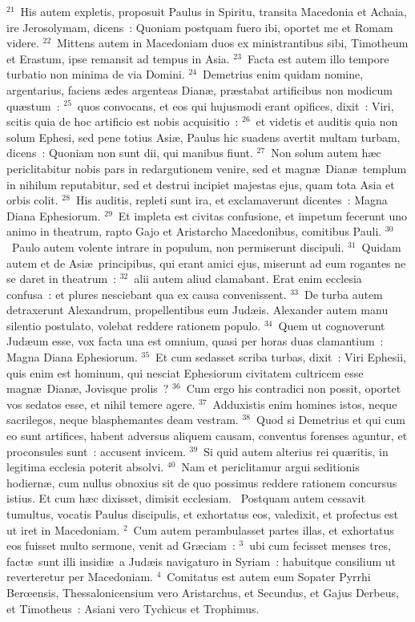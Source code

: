 ${}^{21}$~His autem expletis, proposuit Paulus in Spiritu, transita Macedonia et Achaia, ire Jerosolymam, dicens~: Quoniam postquam fuero ibi, oportet me et Romam videre.
${}^{22}$~Mittens autem in Macedoniam duos ex ministrantibus sibi, Timotheum et Erastum, ipse remansit ad tempus in Asia.
${}^{23}$~Facta est autem illo tempore turbatio non minima de via Domini.
${}^{24}$~Demetrius enim quidam nomine, argentarius, faciens \ae des argenteas Dian\ae , pr\ae stabat artificibus non modicum qu\ae stum~:
${}^{25}$~quos convocans, et eos qui hujusmodi erant opifices, dixit~: Viri, scitis quia de hoc artificio est nobis acquisitio~:
${}^{26}$~et videtis et auditis quia non solum Ephesi, sed pene totius Asi\ae , Paulus hic suadens avertit multam turbam, dicens~: Quoniam non sunt dii, qui manibus fiunt.
${}^{27}$~Non solum autem h\ae c periclitabitur nobis pars in redargutionem venire, sed et magn\ae\ Dian\ae\ templum in nihilum reputabitur, sed et destrui incipiet majestas ejus, quam tota Asia et orbis colit.
${}^{28}$~His auditis, repleti sunt ira, et exclamaverunt dicentes~: Magna Diana Ephesiorum.
${}^{29}$~Et impleta est civitas confusione, et impetum fecerunt uno animo in theatrum, rapto Gajo et Aristarcho Macedonibus, comitibus Pauli.
${}^{30}$~Paulo autem volente intrare in populum, non permiserunt discipuli.
${}^{31}$~Quidam autem et de Asi\ae\ principibus, qui erant amici ejus, miserunt ad eum rogantes ne se daret in theatrum~:
${}^{32}$~alii autem aliud clamabant. Erat enim ecclesia confusa~: et plures nesciebant qua ex causa convenissent.
${}^{33}$~De turba autem detraxerunt Alexandrum, propellentibus eum Jud\ae is. Alexander autem manu silentio postulato, volebat reddere rationem populo.
${}^{34}$~Quem ut cognoverunt Jud\ae um esse, vox facta una est omnium, quasi per horas duas clamantium~: Magna Diana Ephesiorum.
${}^{35}$~Et cum sedasset scriba turbas, dixit~: Viri Ephesii, quis enim est hominum, qui nesciat Ephesiorum civitatem cultricem esse magn\ae\ Dian\ae , Jovisque prolis~?
${}^{36}$~Cum ergo his contradici non possit, oportet vos sedatos esse, et nihil temere agere.
${}^{37}$~Adduxistis enim homines istos, neque sacrilegos, neque blasphemantes deam vestram.
${}^{38}$~Quod si Demetrius et qui cum eo sunt artifices, habent adversus aliquem causam, conventus forenses aguntur, et proconsules sunt~: accusent invicem.
${}^{39}$~Si quid autem alterius rei qu\ae ritis, in legitima ecclesia poterit absolvi.
${}^{40}$~Nam et periclitamur argui seditionis hodiern\ae , cum nullus obnoxius sit de quo possimus reddere rationem concursus istius. Et cum h\ae c dixisset, dimisit ecclesiam.
~Postquam autem cessavit tumultus, vocatis Paulus discipulis, et exhortatus eos, valedixit, et profectus est ut iret in Macedoniam.
${}^{2}$~Cum autem perambulasset partes illas, et exhortatus eos fuisset multo sermone, venit ad Gr\ae ciam~:
${}^{3}$~ubi cum fecisset menses tres, fact\ae\ sunt illi insidi\ae\ a Jud\ae is navigaturo in Syriam~: habuitque consilium ut reverteretur per Macedoniam.
${}^{4}$~Comitatus est autem eum Sopater Pyrrhi Berœensis, Thessalonicensium vero Aristarchus, et Secundus, et Gajus Derbeus, et Timotheus~: Asiani vero Tychicus et Trophimus.


